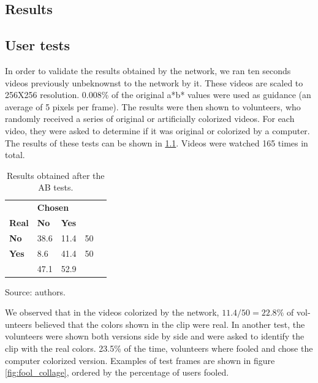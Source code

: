 \documentclass[12pt,openright,oneside,a4paper,english, brazilian]{abntex2}
\begin{document}
\begin{otherlanguage}{english}
\chapter{Results}

\section{User tests}

In order to validate the results obtained by the network, we ran ten seconds videos previously unbeknownst to the network by it. These videos are scaled to 256X256 resolution. 0.008\% of the original a*b* values were used as guidance (an average of 5 pixels per frame). The results were then shown to volunteers, who randomly received a series of original or artificially colorized videos. For each video, they were asked to determine if it was original or colorized by a computer. The results of these tests can be shown in \ref{table:ABresults}. Videos were watched 165 times in total.

\begin{table}[H]
\centering
\caption{Results obtained after the AB tests.}
\begin{tabular}{l|l|l|ll}
\cline{2-3}
                                    & \multicolumn{2}{l|}{\textbf{Chosen}} &                           &  \\ \cline{1-3}
\multicolumn{1}{|l|}{\textbf{Real}} & \textbf{No}      & \textbf{Yes}      &                           &  \\ \cline{1-4}
\multicolumn{1}{|l|}{\textbf{No}}   & 38.6             & 11.4              & \multicolumn{1}{l|}{50} &  \\ \cline{1-4}
\multicolumn{1}{|l|}{\textbf{Yes}}  & 8.6              & 41.4              & \multicolumn{1}{l|}{50} &  \\ \cline{1-4}
                                    & 47.1             & 52.9              &                           &  \\ \cline{2-3}
\end{tabular}
Source: authors.
\label{table:ABresults}
\end{table}

We observed that in the videos colorized by the network, \(11.4/50 = 22.8\% \) of volunteers  believed that the colors shown in the clip were real. In another test, the volunteers were shown both versions side by side and were asked to identify the clip with the real colors. 23.5\% of the time, volunteers where fooled and chose the computer colorized version. Examples of test frames are shown in figure \ref{fig:fool_collage}, ordered by the percentage of users fooled.


\end{otherlanguage}
\end{document}
